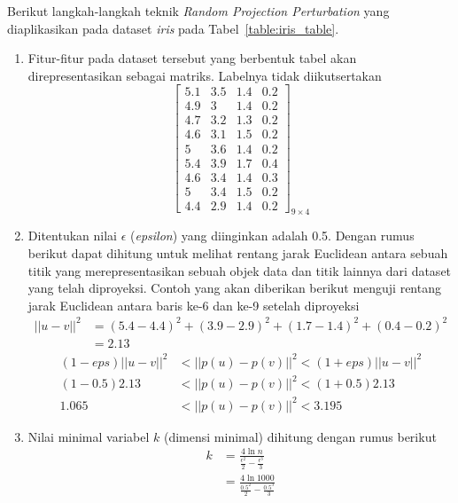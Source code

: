 Berikut langkah-langkah teknik \textit{Random Projection Perturbation} yang diaplikasikan pada dataset \textit{iris} pada Tabel~\ref{table:iris_table}.
\begin{enumerate}
    \item Fitur-fitur pada dataset tersebut yang berbentuk tabel akan direpresentasikan sebagai matriks. Labelnya tidak diikutsertakan
    \[
        \begin{bmatrix}
        5.1		&		3.5		&		1.4		&		0.2	\\
        4.9		&		3		&		1.4		&		0.2	\\
        4.7		&		3.2		&		1.3		&		0.2	\\
        4.6		&		3.1		&		1.5		&		0.2	\\
        5		&		3.6		&		1.4		&		0.2	\\
        5.4		&		3.9		&		1.7		&		0.4	\\
        4.6		&		3.4		&		1.4		&		0.3	\\
        5		&		3.4		&		1.5		&		0.2	\\
        4.4		&		2.9		&		1.4		&		0.2 
        \end{bmatrix}_{9\times 4}
    \]
    \item Ditentukan nilai \(\epsilon\) (\textit{epsilon}) yang diinginkan adalah 0.5. Dengan rumus berikut dapat dihitung untuk melihat rentang jarak Euclidean antara sebuah titik yang merepresentasikan sebuah objek data dan titik lainnya dari dataset yang telah diproyeksi. Contoh yang akan diberikan berikut menguji rentang jarak Euclidean antara baris ke-6 dan ke-9 setelah diproyeksi
    \begin{align*}
        ||u - v||^{2} &= (5.4-4.4)^2 + (3.9-2.9)^2 + (1.7-1.4)^2 + (0.4-0.2)^2
        \\
        &= 2.13
    \end{align*}
    \begin{align*}
        (1-eps)||u - v||^{2}&<||p(u) - p(v)||^{2}<(1+eps)||u - v||^{2}
        \\
        (1-0.5)2.13&<||p(u) - p(v)||^{2}<(1+0.5)2.13
        \\
        1.065&<||p(u) - p(v)||^{2}<3.195
    \end{align*}
    \item Nilai minimal variabel \(k\) (dimensi minimal) dihitung dengan rumus berikut
    \begin{align*}
        k &= \frac{4\ln{n}}{\frac{\epsilon^{2}}{2}-\frac{\epsilon^{3}}{3}} \\
        &= \frac{4\ln{1000}}{\frac{0.5^{2}}{2}-\frac{0.5^{3}}{3}} \\

\end{align*}
\end{enumerate}

